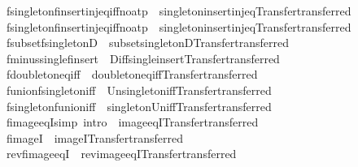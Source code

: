 \begin{isabellebody}
\isamarkupfalse%
\ fsingleton{\isacharunderscore}finsert{\isacharunderscore}inj{\isacharunderscore}eq{\isacharbrackleft}iff{\isacharcomma}no{\isacharunderscore}atp{\isacharbrackright}\ {\isacharequal}\ singleton{\isacharunderscore}insert{\isacharunderscore}inj{\isacharunderscore}eq{\isacharbrackleft}Transfer{\isachardot}transferred{\isacharbrackright}\isanewline
{}\isamarkupfalse%
\ fsingleton{\isacharunderscore}finsert{\isacharunderscore}inj{\isacharunderscore}eq{\isacharprime}{\isacharbrackleft}iff{\isacharcomma}no{\isacharunderscore}atp{\isacharbrackright}\ {\isacharequal}\ singleton{\isacharunderscore}insert{\isacharunderscore}inj{\isacharunderscore}eq{\isacharprime}{\isacharbrackleft}Transfer{\isachardot}transferred{\isacharbrackright}\isanewline
{}\isamarkupfalse%
\ fsubset{\isacharunderscore}fsingletonD\ {\isacharequal}\ subset{\isacharunderscore}singletonD{\isacharbrackleft}Transfer{\isachardot}transferred{\isacharbrackright}\isanewline
{}\isamarkupfalse%
\ fminus{\isacharunderscore}single{\isacharunderscore}finsert\ {\isacharequal}\ Diff{\isacharunderscore}single{\isacharunderscore}insert{\isacharbrackleft}Transfer{\isachardot}transferred{\isacharbrackright}\isanewline
{}\isamarkupfalse%
\ fdoubleton{\isacharunderscore}eq{\isacharunderscore}iff\ {\isacharequal}\ doubleton{\isacharunderscore}eq{\isacharunderscore}iff{\isacharbrackleft}Transfer{\isachardot}transferred{\isacharbrackright}\isanewline
{}\isamarkupfalse%
\ funion{\isacharunderscore}fsingleton{\isacharunderscore}iff\ {\isacharequal}\ Un{\isacharunderscore}singleton{\isacharunderscore}iff{\isacharbrackleft}Transfer{\isachardot}transferred{\isacharbrackright}\isanewline
{}\isamarkupfalse%
\ fsingleton{\isacharunderscore}funion{\isacharunderscore}iff\ {\isacharequal}\ singleton{\isacharunderscore}Un{\isacharunderscore}iff{\isacharbrackleft}Transfer{\isachardot}transferred{\isacharbrackright}\isanewline
{}\isamarkupfalse%
\ fimage{\isacharunderscore}eqI{\isacharbrackleft}simp{\isacharcomma}\ intro{\isacharbrackright}\ {\isacharequal}\ image{\isacharunderscore}eqI{\isacharbrackleft}Transfer{\isachardot}transferred{\isacharbrackright}\isanewline
{}\isamarkupfalse%
\ fimageI\ {\isacharequal}\ imageI{\isacharbrackleft}Transfer{\isachardot}transferred{\isacharbrackright}\isanewline
{}\isamarkupfalse%
\ rev{\isacharunderscore}fimage{\isacharunderscore}eqI\ {\isacharequal}\ rev{\isacharunderscore}image{\isacharunderscore}eqI{\isacharbrackleft}Transfer{\isachardot}transferred{\isacharbrackright}\isanewline

\end{isabellebody}

